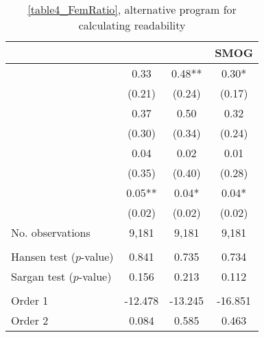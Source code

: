 \begin{table}
    \footnotesize
    \centering
    \begin{threeparttable}
        \caption{\autoref{table4_FemRatio}, alternative program for calculating readability}
        \label{table4_R}
        \begin{tabular}{p{4cm}S@{}S@{}S@{}}
            \toprule
            &{}&{}&{SMOG}\\
            \midrule
            &        0.33   &        0.48** &        0.30*  \\
                                          &      (0.21)   &      (0.24)   &      (0.17)   \\
            &        0.37   &        0.50   &        0.32   \\
                                          &      (0.30)   &      (0.34)   &      (0.24)   \\
            &        0.04   &        0.02   &        0.01   \\
                                          &      (0.35)   &      (0.40)   &      (0.28)   \\
            &        0.05** &        0.04*  &        0.04*  \\
                                          &      (0.02)   &      (0.02)   &      (0.02)   \\
            \midrule
            No. observations     &       9,181   &       9,181   &       9,181   \\
             \\
            \quad Hansen test (\(p\)-value)&       0.841   &       0.735   &       0.734   \\
            \quad Sargan test (\(p\)-value)&       0.156   &       0.213   &       0.112   \\
             \\
            \quad Order 1&     -12.478   &     -13.245   &     -16.851   \\
            \quad Order 2                 &       0.084   &       0.585   &       0.463   \\

\end{tabular}
\end{threeparttable}
\end{table}

